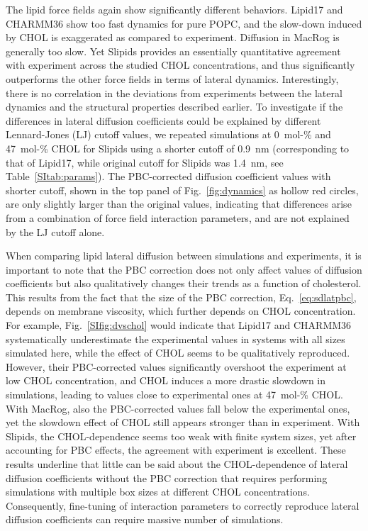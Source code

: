 \documentclass[journal=jctcce]{achemso}
\begin{document}
The lipid force fields again show significantly different behaviors. Lipid17 and CHARMM36 show too fast dynamics for pure POPC, and the slow-down induced by CHOL is exaggerated as compared to experiment. Diffusion in MacRog is generally too slow. Yet Slipids provides an essentially quantitative agreement with experiment across the studied CHOL concentrations, and thus significantly outperforms the other force fields in terms of lateral dynamics. Interestingly, there is no correlation in the deviations from experiments between the lateral dynamics and the structural properties described earlier. To investigate if the differences in lateral diffusion coefficients could be explained by different Lennard-Jones (LJ) cutoff values, we repeated simulations at 0~mol-\% and 47~mol-\% CHOL for Slipids using a shorter cutoff of 0.9~nm (corresponding to that of Lipid17, while original cutoff for Slipids was 1.4~nm, see Table~\ref{SItab:params}). The PBC-corrected diffusion coefficient values with shorter cutoff, shown in the top panel of Fig.~\ref{fig:dynamics} as hollow red circles, are only slightly larger than the original values, indicating that differences arise from a combination of force field interaction parameters, and are not explained by the LJ cutoff alone.

When comparing lipid lateral diffusion between simulations and experiments, it is important to note that the PBC correction does not only affect values of diffusion coefficients but also qualitatively changes their trends as a function of cholesterol. This results from the fact that the size of the PBC correction, Eq.~\eqref{eq:sdlatpbc}, depends on membrane viscosity, which further depends on CHOL concentration. For example, Fig.~\ref{SIfig:dvschol} would indicate that Lipid17 and CHARMM36 systematically underestimate the experimental values in systems with all sizes simulated here, while the effect of CHOL seems to be qualitatively reproduced. However, their PBC-corrected values significantly overshoot the experiment at low CHOL concentration, and CHOL induces a more drastic slowdown in simulations, leading to values close to experimental ones at 47~mol-\% CHOL. With MacRog, also the PBC-corrected values fall below the experimental ones, yet the slowdown effect of CHOL still appears stronger than in experiment. With Slipids, the CHOL-dependence seems too weak with finite system sizes, yet after accounting for PBC effects, the agreement with experiment is excellent. These results underline that little can be said about the CHOL-dependence of lateral diffusion coefficients without the PBC correction that requires performing simulations with multiple box sizes at different CHOL concentrations. Consequently, fine-tuning of interaction parameters to correctly reproduce lateral diffusion coefficients can require massive number of simulations.
\end{document}
